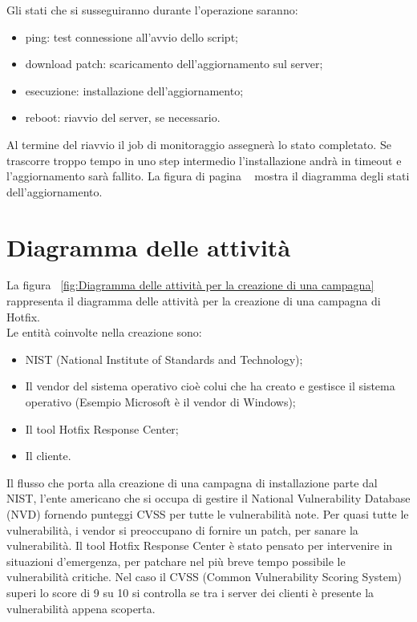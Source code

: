 Gli stati che si susseguiranno durante l’operazione saranno:
\begin{itemize}
\item ping: test connessione all’avvio dello script; 
\item download patch: scaricamento dell’aggiornamento sul server;
\item esecuzione: installazione dell’aggiornamento;
\item reboot: riavvio del server, se necessario.
\end{itemize}
Al termine del riavvio il job di monitoraggio assegnerà lo stato 
completato. Se trascorre troppo tempo in uno step intermedio 
l’installazione andrà in timeout e l’aggiornamento sarà fallito.
La figura di pagina ~\pageref{fig:Diagramma a stati dell'aggiornamento di un server}
mostra il diagramma degli stati dell'aggiornamento.

\section{Diagramma delle attività}
La figura ~\ref{fig:Diagramma delle attività per la creazione di una campagna} 
rappresenta il diagramma delle attività per la creazione di una campagna di Hotfix.\\

Le entità coinvolte nella creazione sono:
\begin{itemize}
\item NIST (National Institute of Standards and Technology);
\item Il vendor del sistema operativo cioè colui che ha creato e gestisce il 
sistema operativo (Esempio Microsoft è il vendor di Windows);
\item Il tool Hotfix Response Center;
\item Il cliente.
\end{itemize}

Il flusso che porta alla creazione di una campagna di installazione 
parte dal NIST, l’ente americano che si occupa di gestire il National 
Vulnerability Database (NVD) fornendo punteggi CVSS per tutte le 
vulnerabilità note. Per quasi tutte le vulnerabilità, i vendor si preoccupano 
di fornire un patch, per sanare la vulnerabilità.
Il tool Hotfix Response Center è stato pensato per intervenire in situazioni 
d'emergenza, per patchare nel più breve tempo possibile le vulnerabilità critiche. 
Nel caso il CVSS (Common Vulnerability Scoring System) superi lo score di 9 su 
10 si controlla se tra i server dei clienti è presente la vulnerabilità appena scoperta.

